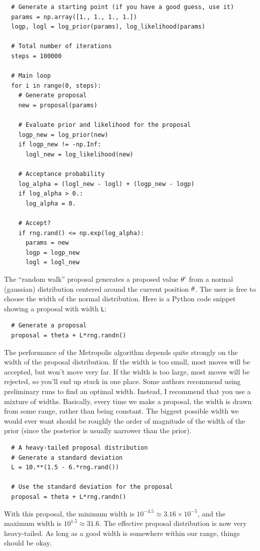 \begin{verbatim}
  # Generate a starting point (if you have a good guess, use it)
  params = np.array([1., 1., 1., 1.])
  logp, logl = log_prior(params), log_likelihood(params)

  # Total number of iterations
  steps = 100000

  # Main loop
  for i in range(0, steps):
    # Generate proposal
    new = proposal(params)

    # Evaluate prior and likelihood for the proposal
    logp_new = log_prior(new)
    if logp_new != -np.Inf:
      logl_new = log_likelihood(new)

    # Acceptance probability
    log_alpha = (logl_new - logl) + (logp_new - logp)
    if log_alpha > 0.:
      log_alpha = 0.

    # Accept?
    if rng.rand() <= np.exp(log_alpha):
      params = new
      logp = logp_new
      logl = logl_new
\end{verbatim}

The ``random walk'' proposal generates a proposed value $\theta'$ from a normal
(gaussian) distribution centered around the current position $\theta$. The user
is free to choose the width of the normal distribution. Here is a Python code
snippet showing a proposal with width {\tt L}:

\begin{verbatim}
  # Generate a proposal
  proposal = theta + L*rng.randn()
\end{verbatim}

The performance of the Metropolis algorithm depends quite strongly on
the width of the proposal distribution. If the width is too small, most moves
will be accepted, but won't move very far. If the width is too large, most
moves will be rejected, so you'll end up stuck in one place. Some authors
recommend using preliminary runs to find an optimal width. Instead, I recommend
that you use a mixture of widths. Basically, every time we make a proposal,
the width is drawn from some range, rather than being constant. The biggest
possible width we would ever want should be roughly the order of magnitude of
the width of the prior (since the posterior is usually narrower than the
prior).
\begin{verbatim}
  # A heavy-tailed proposal distribution
  # Generate a standard deviation
  L = 10.**(1.5 - 6.*rng.rand())

  # Use the standard deviation for the proposal
  proposal = theta + L*rng.randn()
\end{verbatim}
With this proposal, the minimum width is
$10^{-4.5} \approx 3.16 \times 10^{-5}$, and the maximum width is
$10^{1.5} \approx 31.6$. The effective proposal distribution is now very heavy-tailed. As long as a good width is somewhere within our range, things should be
okay.

